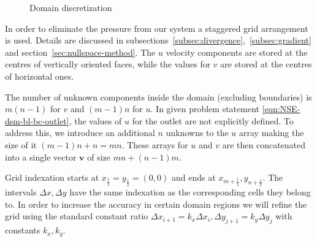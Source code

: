 \documentclass{article}
\begin{document}
\begin{figure}[H] %
  \caption{Domain discretization}\label{bl-domain-discretization}
\end{figure}

In order to eliminate the pressure from our system a staggered grid arrangement is used. Details are discussed in subsections~\ref{subsec:divergence},~\ref{subsec:gradient} and section~\ref{sec:nullspace-method}. The $u$ velocity components are stored at the centres of vertically oriented faces, while the values for $v$ are stored at the centres of horizontal ones. 

The number of unknown components inside the domain (excluding boundaries) is $m(n-1)$ for $v$ and $(m-1)n$ for $u$. In given problem statement \eqref{eqn:NSE-dsm-bl-bc-outlet}, the values of $u$ for the outlet are not explicitly defined. To address this, we introduce an additional $n$ unknowns to the $u$ array making the size of it $(m-1)n+n=mn$. These arrays for $u$ and $v$ are then concatenated into a single vector $\boldsymbol{v}$ of size $mn+(n-1)m$.

Grid indexation starts at $x_{\frac{1}{2}}=y_{\frac{1}{2}}=(0,0)$ and ends at $x_{m+\frac{1}{2}},y_{n+\frac{1}{2}}$. The intervals $\Delta x, \Delta y$ have the same indexation as the corresponding cells they belong to. In order to increase the accuracy in certain domain regions we will refine the grid using the standard constant ratio $\Delta x_{i+1}=k_x\Delta x_i,\Delta y_{j+1}=k_y\Delta y_j$ with constants $k_x,k_y$.
\end{document}
